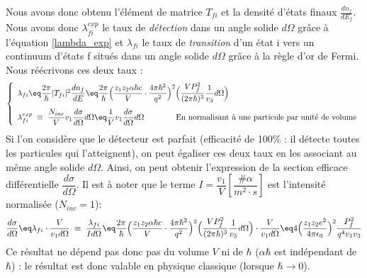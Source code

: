 Nous avons donc obtenu l'élément de matrice $T_{fi}$ et la densité d'états finaux $ \frac{dn_f}{dE_f}$. Nous avons donc $\lambda_{fi}^{exp}$ le taux de \textit{détection} dans un angle solide $d\Omega$ grâce à l'équation \eqref{lambda_exp} et $\lambda_{fi}$ le taux de \textit{transition} d'un état i vers un continuum d'états f situés dans un angle solide $d\Omega$ grâce à la règle d'or de Fermi. Nous réécrivons ces deux taux :
\begin{equation*}
    \left\{
    \begin{array}{ll}
        \lambda_{fi} \eq
        \dfrac{2\pi}{\hbar} |T_{fi}|^2 \dfrac{dn_f}{dE}
        \eq
        \dfrac{2\pi}{\hbar} 
        \Big(
            \dfrac{z_1 z_2\alpha\hbar c}{V} \cdot \dfrac{4 \pi \hbar^2}{q^2}  
        \Big)^2
        \Big(
        \dfrac{V P_f^2}{(2\pi\hbar)^3}\dfrac{1}{v_3}  d\Omega
        \Big)
    \\[13pt]
        \lambda_{fi}^{exp} 
            \; \equiv \;
        \dfrac{N_{inc}}{V} v_1 \dfrac{d\sigma}{d\Omega} d\Omega
            \eq
        \dfrac{1}{V} v_1
        \dfrac{d\sigma}{d\Omega} d\Omega \qquad \qquad \text{En normalisant à une particule par unité de volume}
    \end{array}
    \right.
\end{equation*}
Si l'on considère que le détecteur est parfait (efficacité de 100\% : il détecte toutes les particules qui l'atteignent), on peut égaliser ces deux taux en les associant au même angle solide $d\Omega$. Ainsi, on peut obtenir l'expression de la section efficace différentielle $\dfrac{d\sigma}{d\Omega}$. Il est à noter que le terme $I = \dfrac{v_1}{V} \left[\dfrac{\# \alpha}{m^2\cdot s}\right]$ est l'intensité normalisée ($N_{inc} = 1$):
\begin{equation*}
    \dfrac{d\sigma}{d\Omega}
        \eq
    \lambda_{fi} \cdot \dfrac{V}{v_1 d\Omega}
        \; \equiv \;
    \dfrac{ \lambda_{fi}}{I d\Omega}
        \eq
    \dfrac{2\pi}{\hbar} 
    \Big(
        \dfrac{z_1 z_2\alpha\hbar c}{V} \cdot \dfrac{4 \pi \hbar^2}{q^2}  
    \Big)^2
    \Big(
    \dfrac{V P_f^2}{(2\pi\hbar)^3}\dfrac{1}{v_3}  d\Omega
    \Big)
    \cdot
    \dfrac{V}{v_1 d\Omega}
        \eq
    4 \Big( \dfrac{z_1 z_2e^2}{4\pi\epsilon_0} \Big)^2 \dfrac{P_f^2}{q^4v_1v_3}
\end{equation*}
Ce résultat ne dépend pas donc pas du volume $V$ ni de $\hbar$ ($\alpha \hbar$ est indépendant de $\hbar$) : le résultat est donc valable en physique classique (lorsque $\hbar \rightarrow 0$).\\

